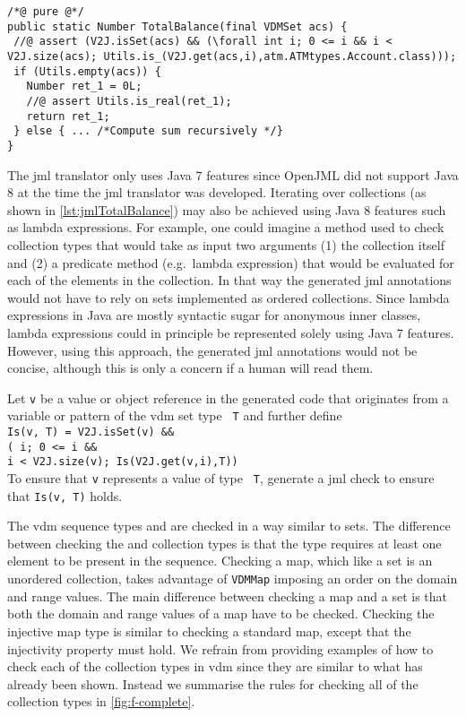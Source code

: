 \begin{lstlisting}[style=customJml,caption={Code-generated version of
the \texttt{TotalBalance} operation.},label={lst:jmlTotalBalance}]
/*@ pure @*/
public static Number TotalBalance(final VDMSet acs) {
 //@ assert (V2J.isSet(acs) && (\forall int i; 0 <= i && i < V2J.size(acs); Utils.is_(V2J.get(acs,i),atm.ATMtypes.Account.class)));
 if (Utils.empty(acs)) {
   Number ret_1 = 0L;
   //@ assert Utils.is_real(ret_1);
   return ret_1;
 } else { ... /*Compute sum recursively */}
}
\end{lstlisting}

The \ac{jml} translator only uses Java 7 features since OpenJML did
not support Java 8 at the time the \ac{jml} translator was
developed. Iterating over collections (as shown in
\autoref{lst:jmlTotalBalance}) may also be achieved using Java 8
features such as lambda expressions. For example, one could imagine a
method used to check collection types that would take as input two
arguments (1) the collection itself and (2) a predicate method (e.g.\
lambda expression) that would be evaluated for each of the elements in
the collection. In that way the generated \ac{jml} annotations would
not have to rely on sets implemented as ordered collections. Since
lambda expressions in Java are mostly syntactic sugar for anonymous
inner classes, lambda expressions could in principle be represented
solely using Java 7 features. However, using this approach, the
generated \ac{jml} annotations would not be concise, although this is
only a concern if a human will read them.

 {Let \texttt{v} be a value or object
  reference in the generated code that originates from a variable or
  pattern of the \ac{vdm} set type \texttt{\kw{set} \kw{of} T} and
  further define\\
  \texttt{Is(v,  T) = V2J.isSet(v) \&\&\\
    (  i; 0 <= i \&\&\\ i <
    V2J.size(v); Is(V2J.get(v,i),T))}\\
  To ensure that \texttt{v}
  represents a value of type \texttt{  T}, generate a
  \ac{jml} check to ensure that \texttt{Is(v,\kw{set} \kw{of} T)}
  holds.}

The \ac{vdm} sequence types  and  are checked in a
way similar to sets. The difference between checking the \kw{seq} and
 collection types is that the \kw{seq1} type requires at
least one element to be present in the sequence. Checking a map, which
like a set is an unordered collection, takes advantage of
\texttt{VDMMap} imposing an order on the domain and range values. The
main difference between checking a map and a set is that both the
domain and range values of a map have to be checked. Checking the
injective map type \kw{inmap} is similar to checking a standard map,
except that the injectivity property must hold. We refrain from
providing examples of how to check each of the collection types in
\ac{vdm} since they are similar to what has already been
shown. Instead we summarise the rules for checking all of the
collection types in \autoref{fig:f-complete}.

